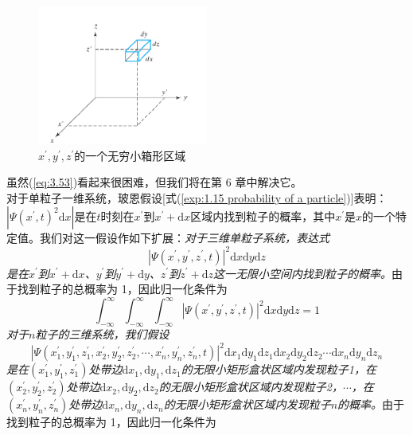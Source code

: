 	\begin{figure}[h!]
		\centering
		\includegraphics[width=0.5\textwidth]{Figures/3.1.png}  %
		\caption{$x^{\prime}, y^{\prime},z^{\prime}$的一个无穷小箱形区域}
		\label{fig:3.1}
	\end{figure}
	虽然(\ref{eq:3.53})看起来很困难，但我们将在第 6 章中解决它。\\
	\indent 对于单粒子一维系统，玻恩假设[式(\ref{exp:1.15 probability of a particle})]表明：$\left|\Psi\left(x^{\prime},t\right)^2\mathrm{d}x\right|$是在$t$时刻在$x^{\prime}$到$x^{\prime}+\mathrm{d}x$区域内找到粒子的概率，其中$x^{\prime}$是$x$的一个特定值。我们对这一假设作如下扩展：\textit{对于三维单粒子系统，表达式}
	\begin{equation}
		\boxed{
			\left|\Psi\left(x^{\prime}, y^{\prime}, z^{\prime},t\right)\right|^2 \mathrm{d}x\mathrm{d}y\mathrm{d}z
		}
		\label{exp:3.54}
	\end{equation}
	\textit{是在$x^{\prime}$到$x^{\prime}+\mathrm{d}x$、$y^{\prime}$到$y^{\prime}+\mathrm{d}y$、$z^{\prime}$到$z^{\prime}+\mathrm{d}z$这一无限小空间内找到粒子的概率。}由于找到粒子的总概率为 1，因此归一化条件为
	\begin{equation}
		\int_{-\infty}^{\infty}\int_{-\infty}^{\infty}\int_{-\infty}^{\infty}\left|\Psi\left(x^{\prime}, y^{\prime}, z^{\prime},t\right)\right|^2 \mathrm{d}x\mathrm{d}y\mathrm{d}z = 1
		\label{eq:3.55}
	\end{equation}
	\indent \textit{对于$n$粒子的三维系统，我们假设}
	\begin{equation}
		\boxed{
			\left|\Psi\left(x_1^{\prime}, y_1^{\prime}, z_1^{\prime},x_2^{\prime}, y_2^{\prime}, z_2^{\prime},\cdots,x_n^{\prime}, y_n^{\prime}, z_n^{\prime},t\right)\right|^2 \mathrm{d}x_1\mathrm{d}y_1\mathrm{d}z_1\mathrm{d}x_2\mathrm{d}y_2\mathrm{d}z_2\cdots\mathrm{d}x_n\mathrm{d}y_n\mathrm{d}z_n
		}
		\label{eq:3.56}
	\end{equation}
	\textit{是在$\left(x_1^{\prime},y_1^{\prime},z_1^{\prime}\right)$处带边$\mathrm{d}x_1,\mathrm{d}y_1,\mathrm{d}z_1$的无限小矩形盒状区域内发现粒子1，在$\left(x_2^{\prime},y_2^{\prime},z_2^{\prime}\right)$处带边$\mathrm{d}x_2,\mathrm{d}y_2,\mathrm{d}z_2$的无限小矩形盒状区域内发现粒子2，$\cdots$，在$\left(x_n^{\prime},y_n^{\prime},z_n^{\prime}\right)$处带边$\mathrm{d}x_n,\mathrm{d}y_n,\mathrm{d}z_n$的无限小矩形盒状区域内发现粒子$n$的概率。}由于找到粒子的总概率为 1，因此归一化条件为
